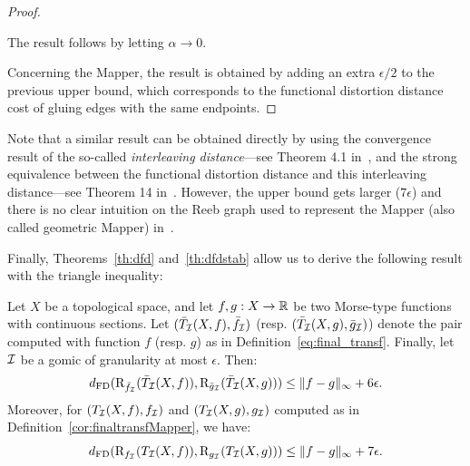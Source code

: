 \begin{proof}
\begin{itemize}
\end{itemize}

The result follows by letting $\alpha \rightarrow 0$.

Concerning the Mapper, the result is obtained by adding an extra $\epsilon/2$ to the previous upper bound,
which corresponds to the functional distortion distance cost of gluing edges with the same endpoints. %
\end{proof}

Note that a similar result can be obtained directly by using the convergence result of the so-called 
{\em interleaving distance}---see Theorem 4.1 in~\cite{Munch16},
and the strong equivalence between the functional distortion distance and this interleaving distance---see Theorem 14 in~\cite{Bauer15}.
However, the upper bound gets larger ($7\epsilon$) and there is no clear intuition on the Reeb graph used to represent the Mapper 
(also called geometric Mapper) in~\cite{Munch16}.

Finally, Theorems~\ref{th:dfd} and~\ref{th:dfdstab} allow us to derive the following result with the triangle inequality:

\begin{cor} Let $X$ be a topological space, and
let $f,g:X\rightarrow\mathbb{R}$ be two Morse-type functions with continuous sections.
Let $(\bar T_{\mathcal I}(X,f),\bar f_{\mathcal I})$ (resp. $(\bar T_{\mathcal I}(X,g),\bar{g}_{\mathcal{I}})$) denote the pair computed with function $f$ (resp. $g$) as in Definition~\ref{eq:final_transf}.
Finally, let $\mathcal{I}$ be a gomic of granularity at most $\epsilon$. Then:
$$d_{\rm FD}(\mathrm{R}_{\bar f_{\mathcal I}}(\bar T_{\mathcal I}(X,f)),\mathrm{R}_{\bar{g}_{\mathcal{I}}}(\bar T_{\mathcal I}(X,g)))\leq \|f-g\|_\infty + 6\epsilon.$$
Moreover, for $(T_{\mathcal I}(X,f),f_{\mathcal I})$ and $(T_{\mathcal I}(X,g),g_{\mathcal{I}})$ computed as in Definition~\ref{cor:finaltransfMapper}, we have:
$$d_{\rm FD}(\mathrm{R}_{f_{\mathcal I}}(T_{\mathcal I}(X,f)),\mathrm{R}_{g_{\mathcal{I}}}(T_{\mathcal I}(X,g)))\leq \|f-g\|_\infty + 7\epsilon.$$
\end{cor}


%
%
%


